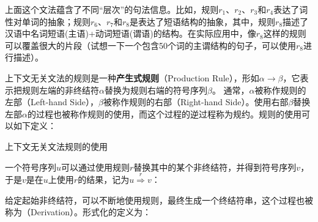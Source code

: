 \parinterval 上面这个文法蕴含了不同``层次''的句法信息。比如，规则$r_1$、$r_2$、$r_3$和$r_4$表达了词性对单词的抽象；规则$r_6$、$r_7$和$r_8$是表达了短语结构的抽象，其中，规则$r_8$描述了汉语中名词短语(主语)+动词短语(谓语)的结构。在实际应用中，像$r_8$这样的规则可以覆盖很大的片段（试想一下一个包含50个词的主谓结构的句子，可以使用$r_8$进行描述）。

\parinterval 上下文无关文法的规则是一种{\small\sffamily\bfseries{产生式规则}}（Production Rule），形如$\alpha \to \beta $，它表示把规则左端的非终结符$\alpha$替换为规则右端的符号序列$\beta$。 通常，$\alpha$被称作规则的左部（Left-hand Side），$\beta$被称作规则的右部（Right-hand Side）。使用右部$\beta$替换左部$\alpha$的过程也被称作规则的使用，而这个过程的逆过程称为规约。规则的使用可以如下定义：

\vspace{0.5em}
\begin{definition} 上下文无关文法规则的使用

一个符号序列$u$可以通过使用规则$r$替换其中的某个非终结符，并得到符号序列$v$，于是$v$是在$u$上使用$r$的结果，记为$u \overset{r}{\Rightarrow} v$：
\begin{center}

\end{center}
\end{definition}

\parinterval 给定起始非终结符，可以不断地使用规则，最终生成一个终结符串，这个过程也被称为{\small{}}（Derivation）。形式化的定义为：

